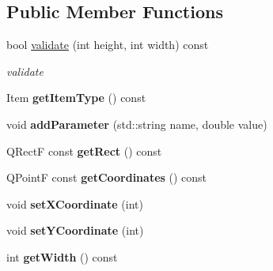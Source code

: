 \subsection*{Public Member Functions}
\begin{DoxyCompactItemize}
\item 
\hypertarget{classBlockConfigItem_ae60a46647e2c32ef3fe61d845fe20653}{bool \hyperlink{classBlockConfigItem_ae60a46647e2c32ef3fe61d845fe20653}{validate} (int height, int width) const }\label{classBlockConfigItem_ae60a46647e2c32ef3fe61d845fe20653}

\begin{DoxyCompactList}\small\item\em validate \end{DoxyCompactList}\item 
\hypertarget{classBlockConfigItem_a0c7ac57d0f2d42bef3ba48f0241599cb}{Item {\bfseries get\-Item\-Type} () const }\label{classBlockConfigItem_a0c7ac57d0f2d42bef3ba48f0241599cb}

\item 
\hypertarget{classBlockConfigItem_a71fb07630e0bac96aaa25bf52896736f}{void {\bfseries add\-Parameter} (std\-::string name, double value)}\label{classBlockConfigItem_a71fb07630e0bac96aaa25bf52896736f}

\item 
\hypertarget{classBlockConfigItem_a13dc8cc072d44c09f0428ef9df72cbb5}{Q\-Rect\-F const {\bfseries get\-Rect} () const }\label{classBlockConfigItem_a13dc8cc072d44c09f0428ef9df72cbb5}

\item 
\hypertarget{classBlockConfigItem_ae33e71a9ba70019636a49329a39fec90}{Q\-Point\-F const {\bfseries get\-Coordinates} () const }\label{classBlockConfigItem_ae33e71a9ba70019636a49329a39fec90}

\item 
\hypertarget{classBlockConfigItem_a62fba644d2219719359eb09ffba10f80}{void {\bfseries set\-X\-Coordinate} (int)}\label{classBlockConfigItem_a62fba644d2219719359eb09ffba10f80}

\item 
\hypertarget{classBlockConfigItem_adcd88548479a1cdb3a5179983c6a35aa}{void {\bfseries set\-Y\-Coordinate} (int)}\label{classBlockConfigItem_adcd88548479a1cdb3a5179983c6a35aa}

\item 
\hypertarget{classBlockConfigItem_aa69e92e67f3d87fa1b8c352a8aa330df}{int {\bfseries get\-Width} () const }\label{classBlockConfigItem_aa69e92e67f3d87fa1b8c352a8aa330df}


\end{DoxyCompactItemize}
